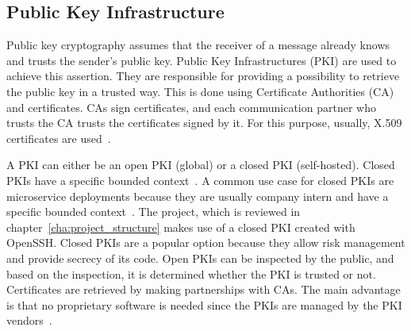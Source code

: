 \subsection{Public Key Infrastructure} \label{sec:pki}
Public key cryptography assumes that the receiver of a message already knows and trusts the sender's public key.
Public Key Infrastructures (PKI) are used to achieve this assertion.
They are responsible for providing a possibility to retrieve the public key in a trusted way.
This is done using Certificate Authorities (CA) and certificates.
CAs sign certificates, and each communication partner who trusts the CA trusts the certificates signed by it.
For this purpose, usually, X.509 certificates are used~\cite{anderson2020security}.

A PKI can either be an open PKI (global) or a closed PKI (self-hosted).
Closed PKIs have a specific bounded context~\cite{hlavaty2003risk}.
A common use case for closed PKIs are microservice deployments because they are usually company intern and have a specific bounded context~\cite{dias2020microservices}.
The project, which is reviewed in chapter~\ref{cha:project_structure} makes use of a closed PKI created with OpenSSH.
Closed PKIs are a popular option because they allow risk management and provide secrecy of its code.
Open PKIs can be inspected by the public, and based on the inspection, it is determined whether the PKI is trusted or not.
Certificates are retrieved by making partnerships with CAs.
The main advantage is that no proprietary software is needed since the PKIs are managed by the PKI vendors~\cite{hlavaty2003risk}.


